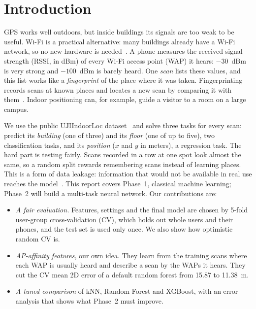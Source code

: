\section{Introduction}\label{sec:intro}

GPS works well outdoors, but inside buildings its signals are too weak to be
useful. Wi-Fi is a practical alternative: many buildings already have a Wi-Fi
network, so no new hardware is needed~\cite{he2016wifi}. A phone measures the
received signal strength (RSSI, in dBm) of every Wi-Fi access point (WAP) it
hears: $-30$~dBm is very strong and $-100$~dBm is barely heard. One
\emph{scan} lists these values, and this list works like a \emph{fingerprint}
of the place where it was taken. Fingerprinting records scans at known places
and locates a new scan by comparing it with
them~\cite{bahl2000radar,liu2007survey}. Indoor positioning can, for
example, guide a visitor to a room on a large campus.

We use the public UJIIndoorLoc dataset~\cite{torres2014ujiindoorloc} and solve
three tasks for every scan: predict its \emph{building} (one of three) and its
\emph{floor} (one of up to five), two classification tasks, and its
\emph{position} ($x$ and $y$ in meters), a regression task. The hard part is
testing fairly. Scans recorded in a row at one spot look almost the same, so a
random split rewards remembering scans instead of learning places. This is a
form of data leakage: information that would not be available in real use
reaches the model~\cite{kaufman2012leakage}. This report covers Phase~1,
classical machine learning; Phase~2 will build a multi-task neural network.
Our contributions are:
\begin{itemize}
\item \emph{A fair evaluation.} Features, settings and the final model are
  chosen by 5-fold user-group cross-validation (CV), which holds out whole
  users and their phones, and the test set is used only once. We also show
  how optimistic random CV is.
\item \emph{AP-affinity features}, our own idea. They learn from the training
  scans where each WAP is usually heard and describe a scan by the WAPs it
  hears. They cut the CV mean 2D error of a default random forest from 15.87 to
  11.38~m.
\item \emph{A tuned comparison} of kNN, Random Forest and XGBoost, with an
  error analysis that shows what Phase~2 must improve.
\end{itemize}
